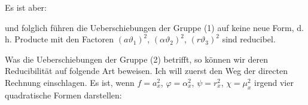 
Es ist aber:


und folglich führen die Ueberschiebungen der Gruppe (1) auf keine neue Form, d. h.
Producte mit den Factoren $(a\vartheta_1)^2$, $(\alpha\vartheta_2)^2$,
$(r\vartheta_3)^2$ sind reducibel.

Was die Ueberschiebungen der Gruppe (2) betrifft, so können wir deren
Reducibilität auf folgende Art beweisen. Ich will zuerst den Weg der directen
Rechnung einschlagen. Es ist, wenn $f=a_x^2$, $\varphi=\alpha_x^2$, $\psi=r_x^2$,
$\chi=\mu_x^2$ irgend vier quadratische Formen darstellen:



